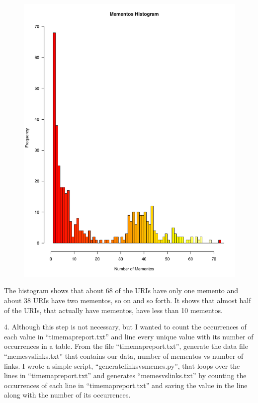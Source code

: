 \documentclass[a4paper, 11pt]{article}
\begin{document}
\begin{figure}[H]
\centering
\includegraphics[scale=0.7]{hist2.pdf}
\end{figure}
\pagebreak

The histogram shows that about 68 of the URIs have only one memento and about 38 URIs have two mementos, so on and so forth. It shows that almost half of the URIs, that actually have mementos, have less than 10 mementos.

4. Although this step is not necessary, but I wanted to count the occurrences of each value in ``timemapreport.txt'' and line every unique value with its number of occurrences in a table. From the file ``timemapreport.txt'', generate the data file ``memesvslinks.txt'' that contains our data, number of mementos vs number of links. I wrote a simple script, ``generatelinksvsmemes.py'', that loops over the lines in ``timemapreport.txt'' and generates ``memesvslinks.txt'' by counting the occurrences of each line in ``timemapreport.txt'' and saving the value in the line along with the number of its occurrences.
\end{document}
